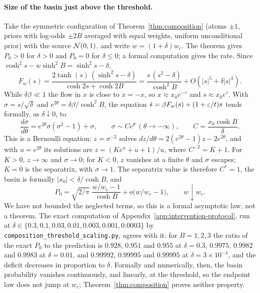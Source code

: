 \documentclass{article} %
\theoremstyle{plain}
\theoremstyle{definition}
\theoremstyle{remark}
\begin{document}
\paragraph{Size of the basin just above the threshold.}\label{apx:threshold-scaling} Take the
symmetric configuration of Theorem~\ref{thm:composition} (atoms $\pm1$, priors with log-odds
$\pm2B$ averaged with equal weights, uniform unconditional prior) with the source $\mathcal{N}(0,1)$, and
write $w=(1+\delta)w_c$. The theorem gives $P_0>0$ for $\delta>0$ and $P_0=0$ for $\delta\le0$; a
formal computation gives the rate. Since $\cosh^2s-w\sinh^2B=\sinh^2s-\delta$,
\[
F_w(s)=\frac{2\tanh(s)\,(\sinh^2s-\delta)}{\cosh2s+\cosh2B}
=\frac{s\,(s^2-\delta)}{\cosh^2B}+O(|s|^5+\delta|s|^3).
\]
While $\delta\beta\ll1$ the flow in $x$ is close to $\dot x=-x$, so $x\approx x_0e^{-\tau}$ and
$s\approx x_0e^\tau$. With $\sigma=s/\sqrt\delta$ and $e^{2\theta}=\delta\beta/\cosh^2B$, the
equation $\dot s=\beta F_w(s)+(1+\varepsilon/t)s$ tends formally, as $\delta\downarrow0$, to
\[
\frac{d\sigma}{d\theta}=e^{2\theta}\sigma(\sigma^2-1)+\sigma,\qquad
\sigma\sim Ce^\theta\ (\theta\to-\infty),\qquad C=\frac{x_0\cosh B}{\delta}.
\]
This is a Bernoulli equation: $z=\sigma^{-2}$ solves $dz/d\theta=2(e^{2\theta}-1)z-2e^{2\theta}$,
and with $u=e^{2\theta}$ its solutions are $z=(Ke^u+u+1)/u$, where $C^{-2}=K+1$. For $K>0$,
$z\to\infty$ and $\sigma\to0$; for $K<0$, $z$ vanishes at a finite $\theta$ and $\sigma$ escapes;
$K=0$ is the separatrix, with $\sigma\to1$. The separatrix value is therefore $C^\ast=1$, the
basin is formally $|x_0|<\delta/\cosh B$, and
\[
P_0=\sqrt{2/\pi}\;\frac{w/w_c-1}{\cosh B}+o\bigl(w/w_c-1\bigr),\qquad w\downarrow w_c .
\]
We have not bounded the neglected terms, so this is a formal asymptotic law, not a theorem. The
exact computation of Appendix~\ref{app:intervention-protocol}, run at
$\delta\in\{0.3,0.1,0.03,0.01,0.003,0.001,0.0003\}$ by
\texttt{composition\_threshold\_scaling.py}, agrees with it: for $B=1,2,3$ the ratio of the
exact $P_0$ to the prediction is $0.928$, $0.951$ and $0.955$ at $\delta=0.3$, $0.9975$,
$0.9982$ and $0.9983$ at $\delta=0.01$, and $0.99992$, $0.99995$ and $0.99995$ at
$\delta=3\times10^{-4}$, and the deficit decreases in proportion to $\delta$. Formally and
numerically, then, the basin probability vanishes continuously, and linearly, at the threshold, so
the endpoint law does not jump at $w_c$; Theorem~\ref{thm:composition} proves neither property.
\end{document}

